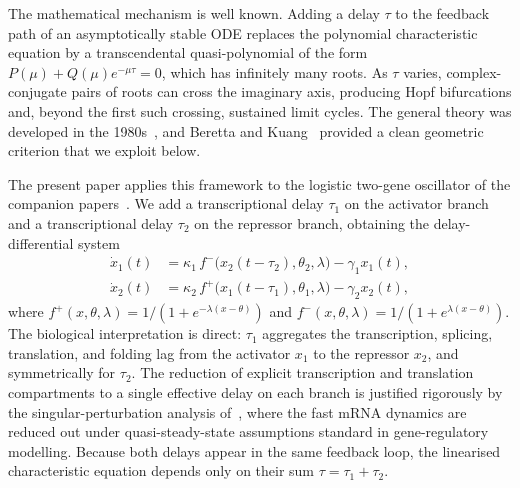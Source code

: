 \documentclass[sn-mathphys,Numbered]{sn-jnl}
\theoremstyle{thmstyleone}
\theoremstyle{thmstyletwo}
\theoremstyle{thmstylethree}
\begin{document}
The mathematical mechanism is well known. Adding a delay $\tau$ to the
feedback path of an asymptotically stable ODE replaces the polynomial
characteristic equation by a transcendental quasi-polynomial of the form
$P(\mu) + Q(\mu)e^{-\mu\tau}=0$, which has infinitely many roots. As $\tau$
varies, complex-conjugate pairs of roots can cross the imaginary axis,
producing Hopf bifurcations and, beyond the first such crossing, sustained
limit cycles. The general theory was developed in the
1980s~\cite{cooke1986zeroes,kuang1993delay,smith2011introduction,hale1993introduction},
and Beretta and Kuang~\cite{beretta2002geometric} provided a clean geometric
criterion that we exploit below.

The present paper applies this framework to the logistic two-gene oscillator
of the companion papers~\cite{belgacem2025exploring, belgacem2026logistic}. We add a transcriptional delay $\tau_1$ on the
activator branch and a transcriptional delay $\tau_2$ on the repressor
branch, obtaining the delay-differential system
\begin{equation}
\begin{aligned}
\dot{x}_1(t) &= \kappa_1\,
  f^-\!\bigl(x_2(t-\tau_2),\theta_2,\lambda\bigr) - \gamma_1 x_1(t),\\[3pt]
\dot{x}_2(t) &= \kappa_2\,
  f^+\!\bigl(x_1(t-\tau_1),\theta_1,\lambda\bigr) - \gamma_2 x_2(t),
\end{aligned}
\label{eq:dde}
\end{equation}
where $f^+(x,\theta,\lambda) = 1/(1+e^{-\lambda(x-\theta)})$ and
$f^-(x,\theta,\lambda) = 1/(1+e^{\lambda(x-\theta)})$. The biological
interpretation is direct: $\tau_1$ aggregates the transcription, splicing,
translation, and folding lag from the activator $x_1$ to the repressor $x_2$,
and symmetrically for $\tau_2$. The reduction of explicit transcription
and translation compartments to a single effective delay on each branch
is justified rigorously by the singular-perturbation analysis
of~\cite{belgacem2018reduction,belgacem2014stability,belgacem2013analysis},
where the fast mRNA dynamics are reduced out under quasi-steady-state
assumptions standard in gene-regulatory modelling. Because both delays
appear in the same feedback loop, the linearised characteristic equation
depends only on their sum $\tau=\tau_1+\tau_2$.
\end{document}
